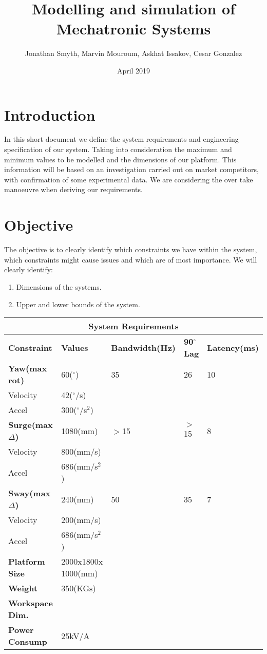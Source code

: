 \documentclass{article}
\title{Modelling and simulation of Mechatronic Systems}
\author{Jonathan Smyth, Marvin Mouroum, Askhat Issakov, Cesar Gonzalez}
\date{April 2019}
\begin{document}
\maketitle
\section{Introduction}
In this short document we define the system requirements and engineering specification of our system. Taking into consideration the maximum and minimum values to be modelled and the dimensions of our platform. This information will be based on an investigation carried out on market competitors, with confirmation of some experimental data. We are considering the over take manoeuvre when deriving our requirements.
\section{Objective}
The objective is to clearly identify which constraints we have within the system, which constraints might cause issues and which are of most importance. 
We will clearly identify:
\begin{enumerate}
	\item Dimensions of the systems.
    \item Upper and lower bounds of the system.
\end{enumerate}
\begin{tabular}{ |p{3cm}||p{2cm}|p{2.7cm}|p{1.4cm}|p{2cm}|  }
 \hline
 \multicolumn{5}{|c|}{System Requirements} \\
 \hline\textbf{Constraint}&        \textbf{Values} &    \textbf{Bandwidth(Hz)}& \textbf{90$^{\circ}$ Lag}&   \textbf{Latency(ms)}\\
 \hline
 \textbf{Yaw(max rot)}&      60($^{\circ}$)&    35&         26&                 10\\
 Velocity&          42($^{\circ}$/s)&     &           &                   \\
 Accel&             300($^{\circ}$/s$^2$)&    &           &                   \\
 \textbf{Surge(max $\Delta$)}&    1080(mm)&    $>$15&        $>$15&                8\\
 Velocity&          800(mm/s)&     &           &                   \\
 Accel&             686(mm/s$^2$)&       &           &                   \\
\textbf{Sway(max $\Delta$)}&     240(mm)&     50&         35&                 7\\
 Velocity&          200(mm/s)&     &           &                   \\
 Accel&             686(mm/s$^2$)&       &           &                   \\
\hline\textbf{Platform Size}&        2000x1800x 1000(mm)&  & & \\
\hline\textbf{Weight}&        350(KGs)&  & & \\
\hline\textbf{Workspace Dim.}&        &  & & \\
\hline\textbf{Power Consump}&        25kV/A&  & & \\
 \hline
\end{tabular}
\end{document}
